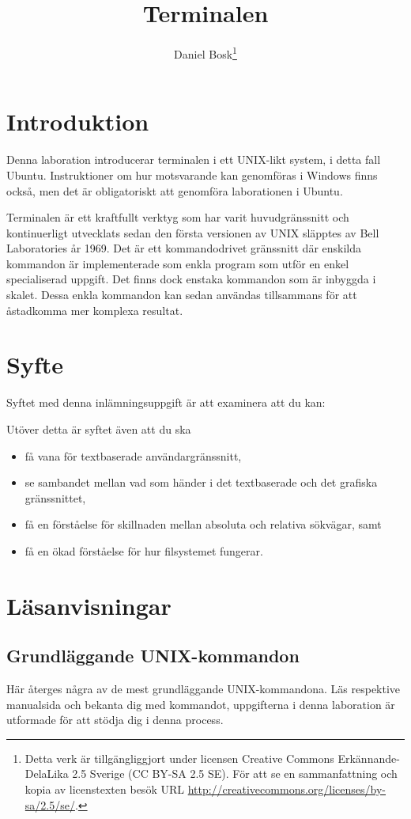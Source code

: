 \documentclass[a4paper,nocourse]{miunasgn}
\title{Terminalen}
\author{Daniel Bosk\footnote{%
  Detta verk är tillgängliggjort under licensen Creative Commons 
  Erkännande-DelaLika 2.5 Sverige (CC BY-SA 2.5 SE).
  För att se en sammanfattning och kopia av licenstexten besök URL 
  \url{http://creativecommons.org/licenses/by-sa/2.5/se/}.
}}
\date{\svnId}
\begin{document}
\maketitle
\thispagestyle{foot}
\tableofcontents


\section{Introduktion}
\label{sec:Introduktion}
\noindent
Denna laboration introducerar terminalen i ett UNIX-likt system, i detta fall 
Ubuntu.
Instruktioner om hur motsvarande kan genomföras i Windows finns också, men det 
är obligatoriskt att genomföra laborationen i Ubuntu.

Terminalen är ett kraftfullt verktyg som har varit huvudgränssnitt och 
kontinuerligt utvecklats sedan den första versionen av UNIX släpptes av 
\foreignlanguage{english}{Bell Laboratories} år 1969.
Det är ett kommandodrivet gränssnitt där enskilda kommandon är implementerade 
som enkla program som utför en enkel specialiserad uppgift.
Det finns dock enstaka kommandon som är inbyggda i skalet.
Dessa enkla kommandon kan sedan användas tillsammans för att åstadkomma mer 
komplexa resultat.


\section{Syfte}
\label{sec:Syfte}
\noindent
Syftet med denna inlämningsuppgift är att examinera att du kan:
\begin{itemize}
  
\end{itemize}
Utöver detta är syftet även att du ska
\begin{itemize}
  \item få vana för textbaserade användargränssnitt,
  \item se sambandet mellan vad som händer i det textbaserade och det
    grafiska gränssnittet,
  \item få en förståelse för skillnaden mellan absoluta och relativa
    sökvägar, samt
  \item få en ökad förståelse för hur filsystemet fungerar.
\end{itemize}


\section{Läsanvisningar}
\label{sec:Lasanvisningar}
\noindent


\subsection{Grundläggande UNIX-kommandon}
Här återges några av de mest grundläggande UNIX-kommandona.
Läs respektive manualsida och bekanta dig med kommandot, uppgifterna i denna 
laboration är utformade för att stödja dig i denna process.
\end{document}
